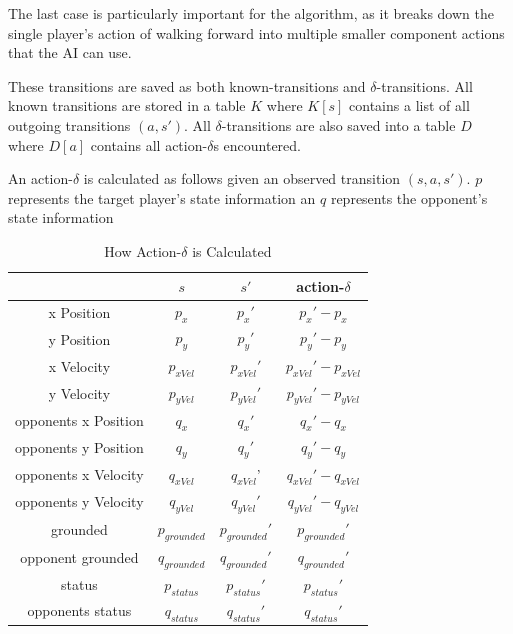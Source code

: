The last case is particularly important for the algorithm, as it breaks down the single player's action of walking forward into multiple smaller component actions that the AI can use.

These transitions are saved as both known-transitions and $\delta$-transitions. All known transitions are stored in a table $K$ where $K[s]$ contains a list of all outgoing transitions $(a,s')$. All $\delta$-transitions are also saved into a table $D$ where $D[a]$ contains all action-$\delta$s encountered. 

An action-$\delta$ is calculated as follows given an observed transition $(s, a, s')$. $p$ represents the target player's state information an $q$ represents the opponent's state information

\begin{table}[h]
	\centering
	\caption{How Action-$\delta$ is Calculated}
	\begin{tabular}{| c | c | c | c |}
		\hline
		 & $s$ & $s'$ & action-$\delta$ \\
		\hline
		x Position        			& $p_{x}$ & $p_{x}'$ & $p_{x}' - p_{x}$ 	\\
		\hline            			
		y Position        			& $p_{y}$ & $p_{y}'$ & $p_{y}' - p_{y}$ 	\\
		\hline            			
		x Velocity        			& $p_{xVel}$ & $p_{xVel}'$ & $p_{xVel}' - p_{xVel}$  \\
		\hline            			
		y Velocity        			& $p_{yVel}$ & $p_{yVel}'$ & $p_{yVel}' - p_{yVel}$	\\
		\hline
		opponents x Position        & $q_{x}$ & $q_{x}'$ & $q_{x}' - q_{x}$	\\
		\hline
		opponents y Position        & $q_{y}$ & $q_{y}'$ & $q_{y}' - q_{y}$ \\
		\hline
		opponents x Velocity        & $q_{xVel}$& $q_{xVel}$' & $q_{xVel}' - q_{xVel}$	\\
		\hline
		opponents y Velocity        & $q_{yVel}$ & $q_{yVel}'$ & $q_{yVel}' - q_{yVel}$	\\
		\hline
		grounded        			& $p_{grounded}$ & $p_{grounded}'$ & $p_{grounded}'$	\\
		\hline
		opponent grounded       	& $q_{grounded}$ & $q_{grounded}'$ & $q_{grounded}'$ 	\\
		\hline
		status       				& $p_{status}$ & $p_{status}'$ & $p_{status}'$ 	\\
		\hline
		opponents status        	& $q_{status}$ & $q_{status}'$ & $q_{status}'$ 	\\
		\hline
	\end{tabular}
	\label{gamestate}
\end{table}

